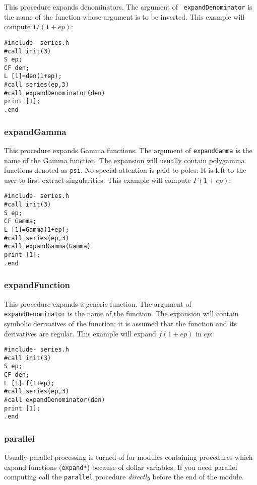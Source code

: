 \documentclass{article}
\begin{document}
This procedure expands denominators. The argument of {\tt
expandDenominator} is the name of the function whose argument is to be
inverted. This example will compute $1/(1+ep)$:
\begin{verbatim}
#include- series.h
#call init(3)
S ep;
CF den;
L [1]=den(1+ep);
#call series(ep,3)
#call expandDenominator(den)
print [1];
.end
\end{verbatim}

\subsubsection{expandGamma}
\label{sec:exp_Gamma}

This procedure expands Gamma functions. The argument of {\tt expandGamma} is
the name of the Gamma function. The expansion will usually contain polygamma
functions denoted as {\tt psi}. No special attention is paid to
poles. It is left to the user to first extract singularities.
This example will compute $\Gamma(1+ep)$:
\begin{verbatim}
#include- series.h
#call init(3)
S ep;
CF Gamma;
L [1]=Gamma(1+ep);
#call series(ep,3)
#call expandGamma(Gamma)
print [1];
.end
\end{verbatim}

\subsubsection{expandFunction}
\label{sec:inv_fun}

This procedure expands a generic function. The argument of {\tt
expandDenominator} is the name of the function. The expansion will
contain symbolic derivatives of the function; it is assumed that the
function and its derivatives are regular.
This example will expand $f(1+ep)$ in $ep$:
\begin{verbatim}
#include- series.h
#call init(3)
S ep;
CF den;
L [1]=f(1+ep);
#call series(ep,3)
#call expandDenominator(den)
print [1];
.end
\end{verbatim}

\subsubsection{parallel}
\label{sec:parallel}

Usually parallel processing is turned of for modules containing
procedures which expand functions ({\tt expand*}) because of
dollar variables. If you need
parallel computing call the {\tt parallel} procedure {\em directly}
  before the end of the module.
\end{document}
